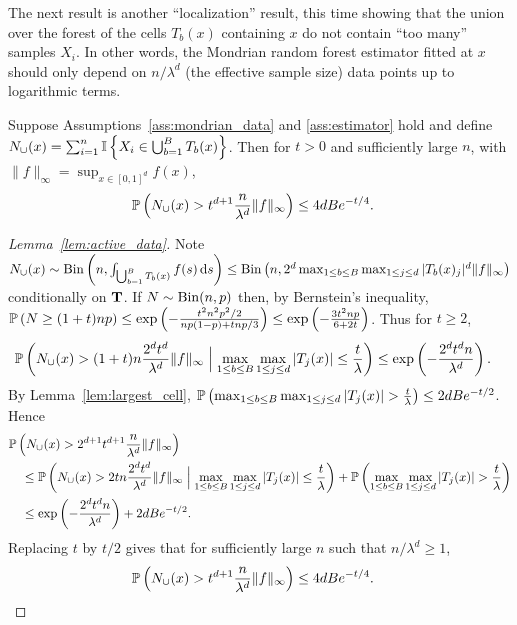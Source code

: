 The next result is another ``localization'' result, this time
showing that the union over the forest
of the cells $T_b(x)$ containing $x$ do not contain ``too many''
samples $X_i$.
In other words, the Mondrian random forest estimator fitted at $x$
should only depend on $n/\lambda^d$ (the effective sample size)
data points up to logarithmic terms.

\begin{lemma}%
  \label{lem:active_data}
  Suppose Assumptions~\ref{ass:mondrian_data} and \ref{ass:estimator} hold
  and define
  $N_{\cup}(x) =
  \sum_{i=1}^{n} \I \left\{ X_i \in \bigcup_{b=1}^{B} T_b(x) \right\}$.
  Then for $t > 0$ and sufficiently large $n$,
  with $\|f\|_\infty = \sup_{x \in [0,1]^d} f(x)$,
  \begin{align*}
    \P \left( N_{\cup}(x) > t^{d+1}
      \frac{n}{\lambda^d}
      \|f\|_\infty
    \right)
    &\leq
    4 d B e^{-t/4}.
  \end{align*}
\end{lemma}

\begin{proof}[Lemma~\ref{lem:active_data}]

  Note
  $N_\cup(x) \sim
  \Bin\left(n, \int_{\bigcup_{b=1}^{B} T_b(x)} f(s) \diff s \right)
  \leq \Bin\left(n, 2^d \max_{1 \leq b \leq B} \max_{1 \leq j \leq d}
  |T_b(x)_j|^d \|f\|_\infty \right)$
  conditionally on $\bT$.
  If $N \sim \Bin(n,p)$ then, by Bernstein's inequality,
  $\P\left( N \geq (1 + t) n p\right)
  \leq \exp\left(-\frac{t^2 n^2 p^2 / 2}{n p(1-p) + t n p / 3}\right)
  \leq \exp\left(-\frac{3t^2 n p}{6 + 2t}\right)$.
  Thus for $t \geq 2$,
  \begin{align*}
    \P \left( N_{\cup}(x) > (1+t) n \frac{2^d t^d}{\lambda^d}
      \|f\|_\infty
      \Bigm| \max_{1 \leq b \leq B} \max_{1 \leq j \leq d}
      |T_j(x)| \leq \frac{t}{\lambda}
    \right)
    &\leq
    \exp\left(- \frac{2^d t^{d} n}{\lambda^d}\right).
  \end{align*}
  By Lemma~\ref{lem:largest_cell},
  $\P \left( \max_{1 \leq b \leq B} \max_{1 \leq j \leq d}
  |T_j(x)| > \frac{t}{\lambda} \right)
  \leq 2 d B e^{-t/2}$.
  Hence
  \begin{align*}
    &\P \left( N_{\cup}(x) > 2^{d+1} t^{d+1} \frac{n}{\lambda^d}
      \|f\|_\infty
    \right) \\
    &\quad\leq
    \P \left( N_{\cup}(x) > 2 t n \frac{2^d t^d}{\lambda^d}
      \|f\|_\infty
      \Bigm| \max_{1 \leq b \leq B} \max_{1 \leq j \leq d}
      |T_j(x)| \leq \frac{t}{\lambda}
    \right)
    + \P \left( \max_{1 \leq b \leq B} \max_{1 \leq j \leq d}
      |T_j(x)| > \frac{t}{\lambda}
    \right) \\
    &\quad\leq
    \exp\left(- \frac{2^d t^{d} n}{\lambda^d}\right)
    + 2 d B e^{-t/2}.
  \end{align*}
  Replacing $t$ by $t/2$
  gives that for sufficiently large $n$ such that
  $n / \lambda^d \geq 1$,
  \begin{align*}
    \P \left( N_{\cup}(x) > t^{d+1}
      \frac{n}{\lambda^d}
      \|f\|_\infty
    \right)
    &\leq
    4 d B e^{-t/4}.
  \end{align*}
\end{proof}

